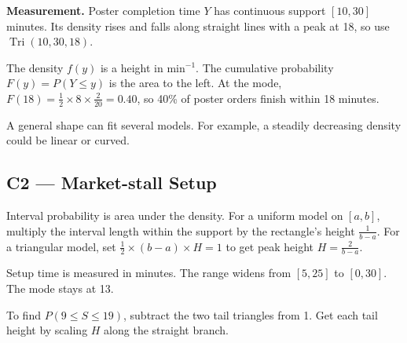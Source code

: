 \textbf{Measurement.} Poster completion time \(Y\) has continuous support \([10,30]\) minutes. Its density rises and falls along straight lines with a peak at 18, so use \(\operatorname{Tri}(10,30,18)\).

The density \(f(y)\) is a height in \(\mathrm{min}^{-1}\). The cumulative probability \(F(y)=P(Y\le y)\) is the area to the left. At the mode, \(F(18)=\frac{1}{2}\times8\times\frac{2}{20}=0.40\), so 40\% of poster orders finish within 18 minutes.

A general shape can fit several models. For example, a steadily decreasing density could be linear or curved.

\subsection*{C2 --- Market-stall Setup}

Interval probability is area under the density. For a uniform model on \([a,b]\), multiply the interval length within the support by the rectangle's height \(\frac{1}{b-a}\). For a triangular model, set \(\frac{1}{2}\times(b-a)\times H=1\) to get peak height \(H=\frac{2}{b-a}\).

\begin{center}
  \par
  {\small Setup time is measured in minutes. The range widens from \([5,25]\) to \([0,30]\). The mode stays at 13.\par}
\end{center}

To find \(P(9\le S\le19)\), subtract the two tail triangles from 1. Get each tail height by scaling \(H\) along the straight branch.

